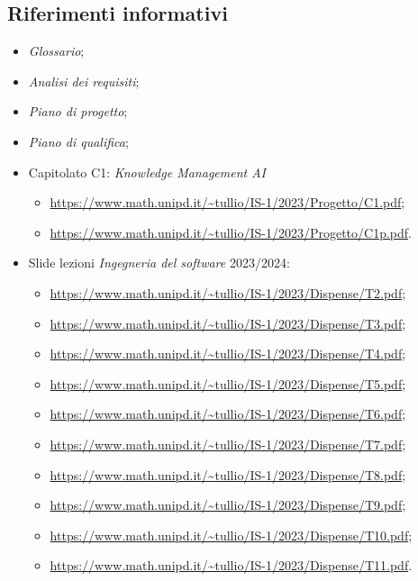 \documentclass[10pt, a4paper]{article}
\begin{document}
    \subsection{Riferimenti informativi}
    \begin{itemize}
        \item \textit{Glossario};
        \item \textit{Analisi dei requisiti};
        \item \textit{Piano di progetto};
        \item \textit{Piano di qualifica};
        \item Capitolato C1: \textit{Knowledge Management AI}
            \begin{itemize}
                \item \url{https://www.math.unipd.it/~tullio/IS-1/2023/Progetto/C1.pdf};
                \item \url{https://www.math.unipd.it/~tullio/IS-1/2023/Progetto/C1p.pdf}.
            \end{itemize}
        \item Slide lezioni \textit{Ingegneria del software} 2023/2024:
            \begin{itemize}
                \item \url{https://www.math.unipd.it/~tullio/IS-1/2023/Dispense/T2.pdf};
                \item \url{https://www.math.unipd.it/~tullio/IS-1/2023/Dispense/T3.pdf};
                \item \url{https://www.math.unipd.it/~tullio/IS-1/2023/Dispense/T4.pdf};
                \item \url{https://www.math.unipd.it/~tullio/IS-1/2023/Dispense/T5.pdf};
                \item \url{https://www.math.unipd.it/~tullio/IS-1/2023/Dispense/T6.pdf};
                \item \url{https://www.math.unipd.it/~tullio/IS-1/2023/Dispense/T7.pdf};
                \item \url{https://www.math.unipd.it/~tullio/IS-1/2023/Dispense/T8.pdf};
                \item \url{https://www.math.unipd.it/~tullio/IS-1/2023/Dispense/T9.pdf};
                \item \url{https://www.math.unipd.it/~tullio/IS-1/2023/Dispense/T10.pdf};
                \item \url{https://www.math.unipd.it/~tullio/IS-1/2023/Dispense/T11.pdf}.
            \end{itemize}
    \end{itemize}
\end{document}
